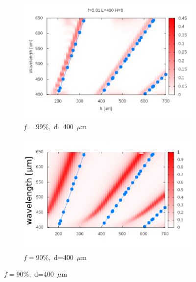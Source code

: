 \begin{figure}[tb]
\begin{subfigure}{0.45\textwidth}
	\includegraphics[width=\textwidth]{images/antenaThz/rezonant_trans_f001.png}
	\caption{$f=$99\%,~d=400~$\mu$m }
	\label{fig:rezof001}
\end{subfigure}
\begin{subfigure}{0.45\textwidth}
	\includegraphics[width=\textwidth]{images/thz/rezonant_trans_f01.png}
	\caption{$f=$90\%,~d=400~$\mu$m }
	\label{fig:rezof01}
\end{subfigure}


\end{figure}

